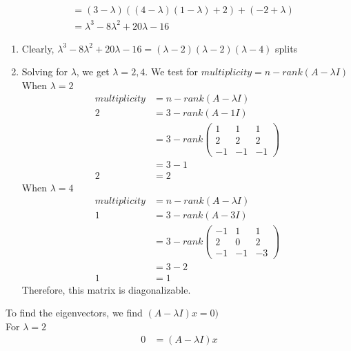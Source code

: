 \documentclass[13pt]{article}
\begin{document}
\begin{enumerate}[label=(\alph*),leftmargin=*]
\begin{align*}
                        &= (3 - \lambda)((4 - \lambda)(1 - \lambda) + 2) + (-2 + \lambda) \\
                        &= \lambda^3 - 8\lambda^2 + 20\lambda - 16
  \end{align*}
  \begin{enumerate}
  \item Clearly, $\lambda^3 - 8\lambda^2 + 20\lambda - 16 = (\lambda - 2)(\lambda - 2)(\lambda - 4)$ splits
  \item Solving for $\lambda$, we get $\lambda = 2, 4$. We test for $multiplicity = n - rank(A - \lambda I)$ \\
    When $\lambda = 2$
    \begin{align*}
      multiplicity &= n - rank(A - \lambda I) \\
      2 &= 3 - rank(A - 1I) \\
                   &= 3 - rank
                     \begin{pmatrix}
                       1 & 1 & 1 \\
                       2 & 2 & 2 \\
                       -1 & -1 & -1
                     \end{pmatrix} \\
                   &= 3 - 1 \\
      2 &= 2
    \end{align*}
    When $\lambda = 4$
    \begin{align*}
      multiplicity &= n - rank(A - \lambda I) \\
      1 &= 3 - rank(A - 3I) \\
                   &= 3 - rank
                     \begin{pmatrix}
                       -1 & 1 & 1 \\
                       2 & 0 & 2 \\
                       -1 & -1 & -3
                     \end{pmatrix} \\
                   &= 3 - 2 \\
      1 &= 1
    \end{align*}
    Therefore, this matrix is diagonalizable.
  \end{enumerate}
    To find the eigenvectors, we find $(A - \lambda I)x = 0)$ \\
  For $\lambda = 2$
  \begin{align*}
    0 &= (A - \lambda I)x \\

\end{align*}
\end{enumerate}
\end{document}
